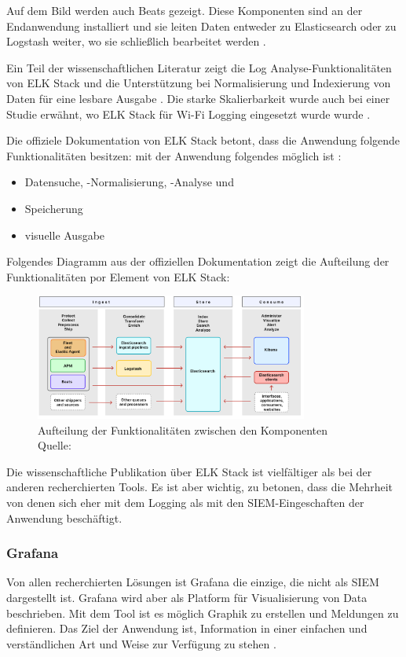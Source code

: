 Auf dem Bild werden auch Beats gezeigt. Diese Komponenten sind an der Endanwendung installiert und sie leiten Daten entweder zu Elasticsearch oder zu Logstash weiter, wo sie schließlich bearbeitet werden \citep{Jain_LMELK}. 

Ein Teil der wissenschaftlichen Literatur zeigt die Log Analyse-Funktionalitäten von ELK Stack und die Unterstützung bei Normalisierung und Indexierung von Daten für eine lesbare Ausgabe \citep{Advani_elkstakc}. Die starke Skalierbarkeit wurde auch bei einer Studie erwähnt, wo ELK Stack für Wi-Fi Logging eingesetzt wurde wurde \citep{Wang_elkwifi}.

Die offiziele Dokumentation von ELK Stack betont, dass die Anwendung folgende Funktionalitäten besitzen:  mit der Anwendung folgendes möglich ist \citep{elastic_docs}:

\begin{itemize}[noitemsep]
   \item Datensuche, -Normalisierung, -Analyse und 
   \item Speicherung
   \item visuelle Ausgabe
\end{itemize}

Folgendes Diagramm aus der offiziellen Dokumentation zeigt die Aufteilung der Funktionalitäten por Element von ELK Stack:

\begin{figure}[H]
   \centering
   \includegraphics[width=0.8\textwidth]{assets/2_p9.png}
   \caption{Aufteilung der Funktionalitäten zwischen den Komponenten\\Quelle: \citep{elastic_docs}}
   \centering
\end{figure}

Die wissenschaftliche Publikation über ELK Stack ist vielfältiger als bei der anderen recherchierten Tools. Es ist aber wichtig, zu betonen, dass die Mehrheit von denen sich eher mit dem Logging als mit den \gls{SIEM}-Eingeschaften der Anwendung beschäftigt.

\subsubsection{Grafana}
Von allen recherchierten Lösungen ist Grafana die einzige, die nicht als \gls{SIEM} dargestellt ist. Grafana wird aber als Platform für Visualisierung von Data beschrieben. Mit dem Tool ist es möglich Graphik zu erstellen und Meldungen zu definieren. Das Ziel der Anwendung ist, Information in einer einfachen und verständlichen Art und Weise zur Verfügung zu stehen \citep{redhat_grafana}.     

